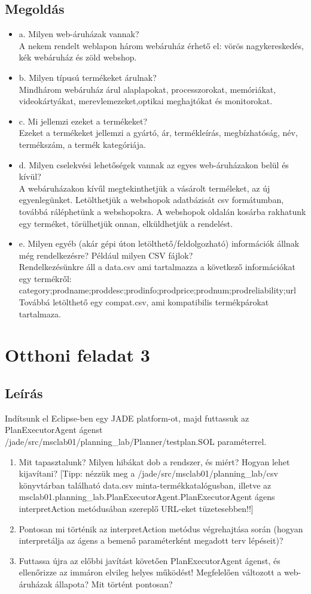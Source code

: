 \subsection{Megoldás}
\begin{itemize}
\item a. Milyen web-áruházak vannak? \\
A nekem rendelt weblapon három webáruház érhető el: vörös nagykereskedés, kék webáruház és zöld webshop. 
\item b. Milyen típusú termékeket árulnak? \\
Mindhárom webáruház árul alaplapokat, processzorokat, memóriákat, videokártyákat, merevlemezeket,optikai meghajtókat és monitorokat.
\item c. Mi jellemzi ezeket a termékeket? \\
Ezeket a termékeket jellemzi a gyártó, ár, termékleírás, megbízhatóság, név, termékszám, a termék kategóriája.
\item d. Milyen cselekvési lehetőségek vannak az egyes web-áruházakon belül és kívül? \\
A webáruházakon kívűl megtekinthetjük a vásárolt terméleket, az új egyenlegünket. Letölthetjük a webshopok adatbázisát csv formátumban, továbbá ráléphetünk a webshopokra.
A webshopok oldalán kosárba rakhatunk egy terméket, törülhetjük onnan, elküldhetjük a rendelést.
\item e. Milyen egyéb (akár gépi úton letölthető/feldolgozható) információk állnak még rendelkezésre? Például milyen CSV fájlok? \\
Rendelkezésünkre áll a data.csv ami tartalmazza a következő információkat egy termékről: category;prodname;proddesc;prodinfo;prodprice;prodnum;prodreliability;url
Továbbá letölthető egy compat.csv, ami kompatibilis termékpárokat tartalmaza.
\end{itemize}

\section{Otthoni feladat 3}
\subsection{Leírás}
Indítsunk el Eclipse-ben egy JADE platform-ot, majd futtassuk az PlanExecutorAgent ágenst /jade/src/msclab01/planning\_lab/Planner/testplan.SOL paraméterrel. 
\begin{enumerate}
\item Mit tapasztalunk? Milyen hibákat dob a rendszer, és miért? Hogyan lehet kijavítani? [Tipp: nézzük meg a /jade/src/msclab01/planning\_lab/csv könyvtárban található data.csv minta-termékkatalógusban, illetve az msclab01.planning\_lab.PlanExecutorAgent.PlanExecutorAgent ágens interpretAction metódusában szereplő URL-eket tüzetesebben!!] 
\item Pontosan mi történik az interpretAction metódus végrehajtása során (hogyan interpretálja az ágens a bemenő paraméterként megadott terv lépéseit)? 
\item Futtassa újra az előbbi javítást követően PlanExecutorAgent ágenst, és ellenőrizze az immáron elvileg helyes működést! Megfelelően változott a web-áruházak állapota? Mit történt pontosan?  
\end{enumerate} 
